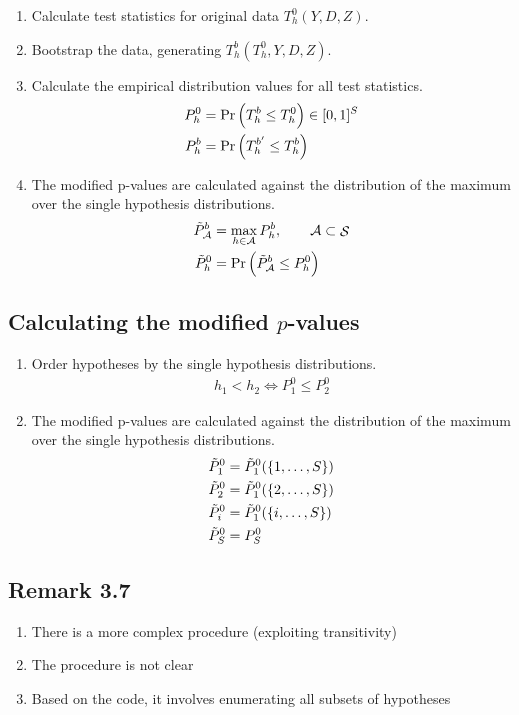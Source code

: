 \documentclass[10pt]{article}
\DeclareMathOperator{\hypSet}{\mathcal{S}}
\begin{document}
	\begin{enumerate}
		\item Calculate test statistics for original data $T^0_h(Y,D,Z)$.
		\item Bootstrap the data, generating $T^b_h(T^0_h,Y,D,Z)$.
		\item Calculate the empirical distribution values for all test statistics.
			\begin{align*}
				P^0_h &= \myPr{T^b_h \leq T^0_h} \in [0,1]^S \\
				P^b_h &= \myPr{T^{b^\prime}_h \leq T^b_h} 
			\end{align*}
		\item The modified p-values are calculated against the distribution of the maximum over the single hypothesis distributions.
			\begin{align*}
				\tilde{P}^b_{\mathcal{A}} &= \max_{h\in\mathcal{A}} P^b_h, \qquad \mathcal{A} \subset \hypSet \\
				\tilde{P}^0_h &= \myPr{ \tilde{P}^b_{\mathcal{A}} \leq P^0_h }
			\end{align*}			
	\end{enumerate}

	\subsection[Calculating the modified p-values]{Calculating the modified $p$-values}

	\begin{enumerate}
		\item Order hypotheses by the single hypothesis distributions.
			\begin{align*}
				h_1 < h_2 \iff P^0_{1} \leq P^0_{2}
			\end{align*}
		\item The modified p-values are calculated against the distribution of the maximum over the single hypothesis distributions.
			\begin{align*}
				\tilde{P}^0_1 &= \tilde{P}^0_1(\set{1,\ldots, S}) \\
				\tilde{P}^0_2 &= \tilde{P}^0_1(\set{2,\ldots, S}) \\
				\tilde{P}^0_i &= \tilde{P}^0_1(\set{i,\ldots, S}) \\
				\tilde{P}^0_S &= P^0_S
			\end{align*}			
	\end{enumerate}
	
	\subsection{Remark 3.7}

	\begin{enumerate}
		\item There is a more complex procedure (exploiting transitivity)
		\item The procedure is not clear
		\item Based on the code, it involves enumerating all subsets of hypotheses
	\end{enumerate}
\end{document}
